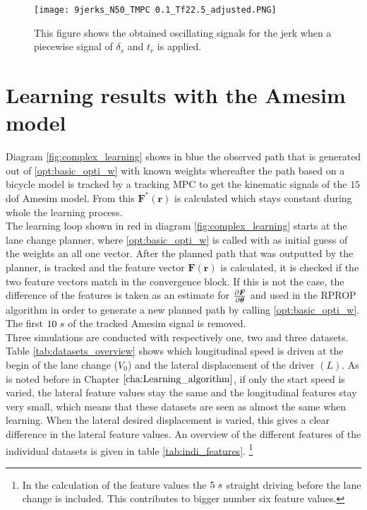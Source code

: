 \begin{figure}[h!]
	\centering
	\texttt{[image: 9jerks\_N50\_TMPC 0.1\_Tf22.5\_adjusted.PNG]}
	\caption{This figure shows the obtained oscillating signals for the jerk when a piecewise signal of $\delta_s$ and $t_r$ is applied.}	
	\label{fig:old_inputs}
\end{figure}

\section{Learning results with the Amesim model}
\label{s:complex_learning_results}
Diagram \ref{fig:complex_learning} shows in blue the observed path that is generated out of \ref{opt:basic_opti_w} with known weights whereafter the path based on a bicycle model is tracked by a tracking MPC to get the kinematic signals of the $15$ dof Amesim model. From this $\bm{F}^*(\bm{r})$ is calculated which stays constant during whole the learning process.\\

The learning loop shown in red in diagram \ref{fig:complex_learning} starts at the lane change planner, where \ref{opt:basic_opti_w} is called with as initial guess of the weights an all one vector. After the planned path that was outputted by the planner, is tracked and the feature vector $\bm{F}(\bm{r})$ is calculated, it is checked if the two feature vectors match in the convergence block. If this is not the case, the difference of the features is taken as an estimate for $\pdv{\bm{F}}{\bm{\theta}}$ and used in the RPROP algorithm in order to generate a new planned path by calling \ref{opt:basic_opti_w}. The first $10 \hspace{1mm}s$ of the tracked Amesim signal is removed.\\
Three simulations are conducted with respectively one, two and three datasets. Table \ref{tab:datasets_overview} shows which longitudinal speed is driven at the begin of the lane change ($V_{0}$) and the lateral displacement of the driver $(L)$. As is noted before in Chapter $\ref{cha:Learning_algorithm}$, if only the start speed is varied, the lateral feature values stay the same and the longitudinal features stay very small, which means that these datasets are seen as almost the same when learning. When the lateral desired displacement is varied, this gives a clear difference in the lateral feature values. An overview of the different features of the individual datasets is given in table \ref{tab:indi_features}. \footnote{In the calculation of the feature values the $5 \hspace{1mm}s$ straight driving before the lane change is included. This contributes to bigger number six feature values.} 



